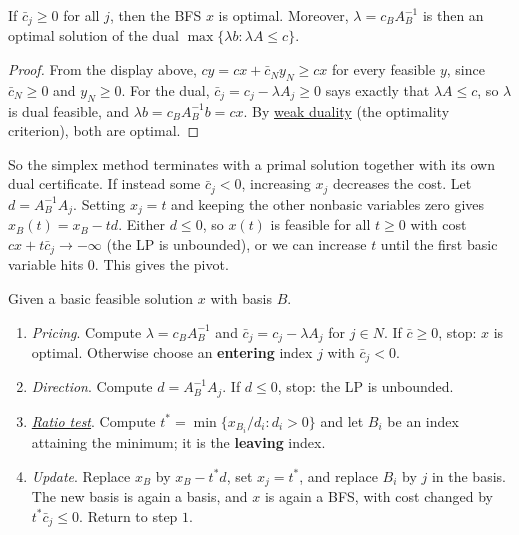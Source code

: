 	\begin{theorem}
	  \label{thm:optimality-test}
		If $\bar c_j \geq 0$ for all $j$, then the BFS $x$ is optimal. Moreover, $\lambda = c_B A_B^{-1}$ is then an optimal solution of the dual $\max\{\lambda b \colon \lambda A \leq c\}$. 
	\end{theorem}
	\begin{proof}
		From the display above, $cy = cx + \bar c_N y_N \geq cx$ for every feasible $y$, since $\bar c_N \geq 0$ and $y_N \geq 0$. For the dual, $\bar c_j = c_j - \lambda A_j \geq 0$ says exactly that $\lambda A \leq c$, so $\lambda$ is dual feasible, and $\lambda b = c_B A_B^{-1} b = cx$. By \hyperref[thm:weak-duality]{weak duality} (the optimality criterion), both are optimal. 
	\end{proof}

	So the simplex method terminates with a primal solution together with its own dual certificate. If instead some $\bar c_j < 0$, increasing $x_j$ decreases the cost. Let $d = A_B^{-1} A_j$. Setting $x_j = t$ and keeping the other nonbasic variables zero gives $x_B(t) = x_B - t d$. Either $d \leq 0$, so $x(t)$ is feasible for all $t \geq 0$ with cost $cx + t \bar c_j \to -\infty$ (the LP is unbounded), or we can increase $t$ until the first basic variable hits $0$. This gives the pivot. 

	\begin{algo}
		Given a basic feasible solution $x$ with basis $B$. 
		\begin{enumerate}
			\item \textit{Pricing}. Compute $\lambda = c_B A_B^{-1}$ and $\bar c_j = c_j - \lambda A_j$ for $j \in N$. If $\bar c \geq 0$, stop: $x$ is optimal. Otherwise choose an \textbf{entering} index $j$ with $\bar c_j < 0$. 
			\item \textit{Direction}. Compute $d = A_B^{-1} A_j$. If $d \leq 0$, stop: the LP is unbounded. 
			\item \textit{\hyperref[real-thm:ratio-test]{Ratio test}}. Compute $t^\ast = \min\{ x_{B_i} / d_i \colon d_i > 0 \}$ and let $B_i$ be an index attaining the minimum; it is the \textbf{leaving} index. 
			\item \textit{Update}. Replace $x_B$ by $x_B - t^\ast d$, set $x_j = t^\ast$, and replace $B_i$ by $j$ in the basis. The new basis is again a basis, and $x$ is again a BFS, with cost changed by $t^\ast \bar c_j \leq 0$. Return to step $1$. 
		\end{enumerate}
	\end{algo}

